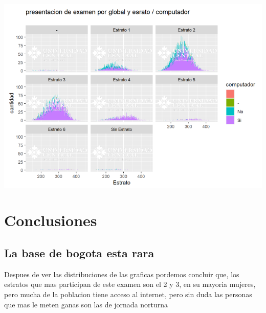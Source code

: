 \documentclass{article}
\begin{document}
\begin{center}
\includegraphics[scale=0.6]{Captura23.PNG} 
\end{center}

\section{Conclusiones}

\subsection{La base de bogota esta rara}

Despues de ver las distribuciones de las graficas pordemos concluir que, los estratos que mas participan de este examen son el 2 y 3, en su mayoria mujeres, pero mucha de la poblacion tiene acceso al internet, pero sin duda las personas que mas le meten ganas son las de jornada norturna



\end{document}

